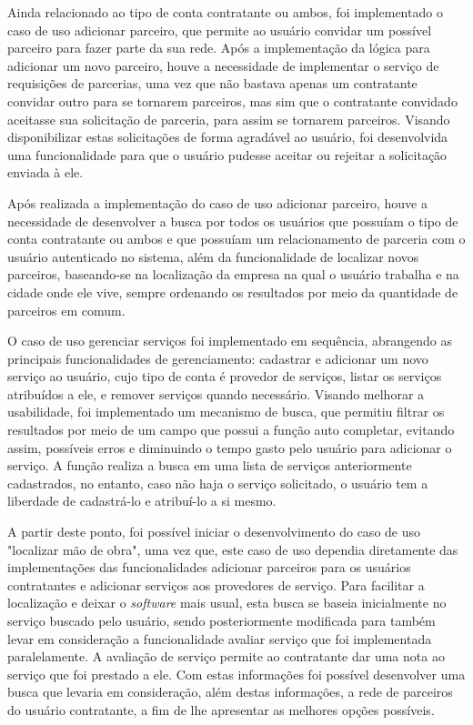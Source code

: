 \par Ainda relacionado ao tipo de conta contratante ou ambos, foi implementado o caso de uso adicionar parceiro, que permite ao usuário convidar um possível parceiro para fazer parte da sua rede. Após a implementação da lógica para adicionar um novo parceiro, houve a necessidade de implementar o serviço de requisições de parcerias, uma vez que não bastava apenas um contratante convidar outro para se tornarem parceiros, mas sim que o contratante convidado aceitasse sua solicitação de parceria, para assim se tornarem parceiros. Visando disponibilizar estas solicitações de forma agradável ao usuário, foi desenvolvida uma funcionalidade para que o usuário pudesse aceitar ou rejeitar a solicitação enviada à ele.

\par Após realizada a implementação do caso de uso adicionar parceiro, houve a necessidade de desenvolver a busca por todos os usuários que possuíam o tipo de conta contratante ou ambos e que possuíam um relacionamento de parceria com o usuário autenticado no sistema, além da funcionalidade de localizar novos parceiros, baseando-se na localização da empresa na qual o usuário trabalha e na cidade onde ele vive, sempre ordenando os resultados por meio da quantidade de parceiros em comum. 

\par O caso de uso gerenciar serviços foi implementado em sequência, abrangendo as principais funcionalidades de gerenciamento: cadastrar e adicionar um novo serviço ao usuário, cujo tipo de conta é provedor de serviços, listar os serviços atribuídos a ele, e remover serviços quando necessário. Visando melhorar a usabilidade, foi implementado um mecanismo de busca, que permitiu filtrar os resultados por meio de um campo que possui a função  auto completar, evitando assim, possíveis erros e diminuindo o tempo gasto pelo usuário para adicionar o serviço. A função realiza a busca em uma lista de serviços anteriormente cadastrados, no entanto, caso não haja o serviço solicitado, o usuário tem a liberdade de cadastrá-lo e atribuí-lo a si mesmo.

\par A partir deste ponto, foi possível iniciar o desenvolvimento do caso de uso "localizar mão de obra", uma vez que, este caso de uso dependia diretamente das implementações das funcionalidades adicionar parceiros para os usuários contratantes e adicionar serviços aos provedores de serviço. Para facilitar a localização e deixar o \textit{software} mais usual, esta busca se baseia inicialmente no serviço buscado pelo usuário, sendo posteriormente modificada para também levar em consideração a funcionalidade avaliar serviço que foi implementada paralelamente. A avaliação de serviço permite ao contratante dar uma nota ao serviço que foi prestado a ele. Com estas informações foi possível desenvolver uma busca que levaria em consideração, além destas informações, a rede de parceiros do usuário contratante, a fim de lhe apresentar as melhores opções possíveis.

